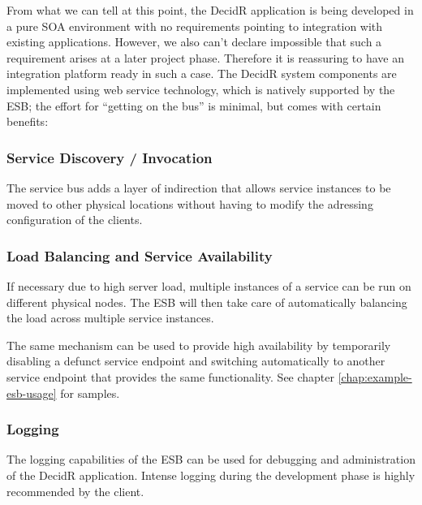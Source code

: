 From what we can tell at this point, the DecidR application is being developed
in a pure SOA environment with no requirements pointing to integration with
existing applications. However, we also can't declare impossible that such a
requirement arises at a later project phase. Therefore it is reassuring
to have an integration platform ready in such a case.
The DecidR system components are implemented using web service technology,
which is natively supported by the ESB; the effort for ``getting on the
bus'' is minimal, but comes with certain benefits:

\subsubsection{Service Discovery / Invocation}
\label{subsec:service-discovery-incovation}

The service bus adds a layer of indirection that allows service instances to be
moved to other physical locations without having to modify the adressing
configuration of the clients.


\newpage
\subsubsection{Load Balancing and Service Availability}
\label{subsec:load-balancing-and-service-availability}
If necessary due to high server load, multiple instances of a service can be
run on different physical nodes. The ESB will then take care of
automatically balancing the load across multiple service instances.

The same mechanism can be used to provide high availability by temporarily
disabling a defunct service endpoint and switching automatically to another
service endpoint that provides the same functionality. See chapter
\ref{chap:example-esb-usage} for samples.

\subsubsection{Logging}
\label{subsec:logging}
The logging capabilities of the ESB can be used for debugging and
administration of the DecidR application. Intense logging during the
development phase is highly recommended by the client.

